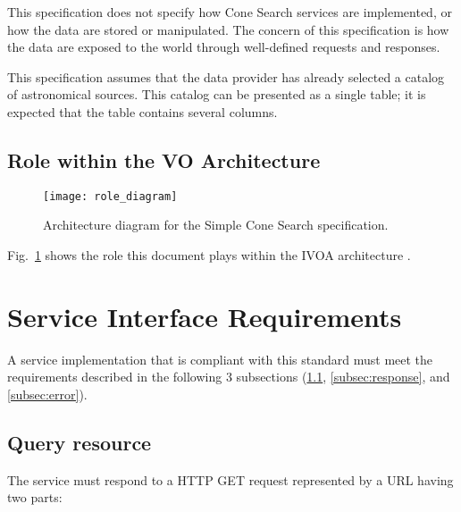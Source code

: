 \documentclass[11pt,a4paper]{ivoa}
\begin{document}
This specification does not specify how Cone Search services are
implemented, or how the data are stored or manipulated. The concern of
this specification is how the data are exposed to the world through
well-defined requests and responses.

This specification assumes that the data provider has already selected a
catalog of astronomical sources. This catalog can be presented as a
single table; it is expected that the table contains several columns.

\subsection{Role within the VO Architecture}

\begin{figure} \centering
\texttt{[image: role\_diagram]}
\caption{Architecture diagram for the Simple Cone Search
specification.}
\label{fig:archdiag} 
\end{figure}

Fig.~\ref{fig:archdiag} shows the role this document plays within the
IVOA architecture \citep{2021ivoa.spec.1101D}.

\section{Service Interface Requirements}
\label{sec:2}

A service implementation that is compliant with this standard must meet
the requirements described in the following 3 subsections
(\ref{subsec:baseurl}, \ref{subsec:response}, and \ref{subsec:error}).

\subsection{Query resource}
\label{subsec:baseurl}

The service must respond to a HTTP GET request
represented by a URL having two parts:\\ 
\end{document}
